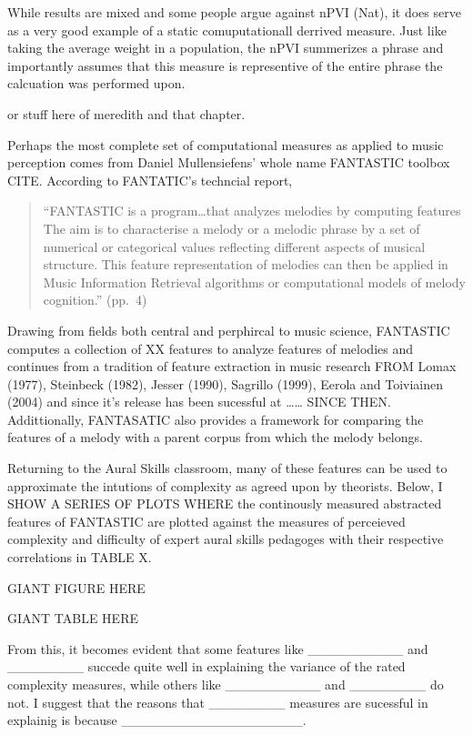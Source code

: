 \documentclass[]{book}
\begin{document}
While results are mixed and some people argue against nPVI (Nat), it does serve as a very good example of a static comuputationall derrived measure.
Just like taking the average weight in a population, the nPVI summerizes a phrase and importantly assumes that this measure is representive of the entire phrase the calcuation was performed upon.

or stuff here of meredith and that chapter.

Perhaps the most complete set of computational measures as applied to music perception comes from Daniel Mullensiefens' whole name FANTASTIC toolbox CITE.
According to FANTATIC's techncial report,

\begin{quote}
``FANTASTIC is a program\ldots{}that analyzes melodies by computing features The aim is to characterise a melody or a melodic phrase by a set of numerical or categorical values reflecting different aspects of musical structure. This feature representation of melodies can then be applied in Music Information Retrieval algorithms or computational
models of melody cognition.'' (pp.~4)
\end{quote}

Drawing from fields both central and perphircal to music science, FANTASTIC computes a collection of XX features to analyze features of melodies and continues from a tradition of feature extraction in music research FROM Lomax (1977), Steinbeck (1982), Jesser (1990), Sagrillo (1999), Eerola and Toiviainen (2004) and since it's release has been sucessful at \ldots{}\ldots{} SINCE THEN.
Addittionally, FANTASATIC also provides a framework for comparing the features of a melody with a parent corpus from which the melody belongs.

Returning to the Aural Skills classroom, many of these features can be used to approximate the intutions of complexity as agreed upon by theorists.
Below, I SHOW A SERIES OF PLOTS WHERE the continously measured abstracted features of FANTASTIC are plotted against the measures of perceieved complexity and difficulty of expert aural skills pedagoges with their respective correlations in TABLE X.

GIANT FIGURE HERE

GIANT TABLE HERE

From this, it becomes evident that some features like \_\_\_\_\_\_\_\_\_\_ and \_\_\_\_\_\_\_\_ succede quite well in explaining the variance of the rated complexity measures, while others like \_\_\_\_\_\_\_\_\_\_ and \_\_\_\_\_\_\_\_ do not.
I suggest that the reasons that \_\_\_\_\_\_\_\_ measures are sucessful in explainig is because \_\_\_\_\_\_\_\_\_\_\_\_\_\_\_\_\_\_\_.
\end{document}
